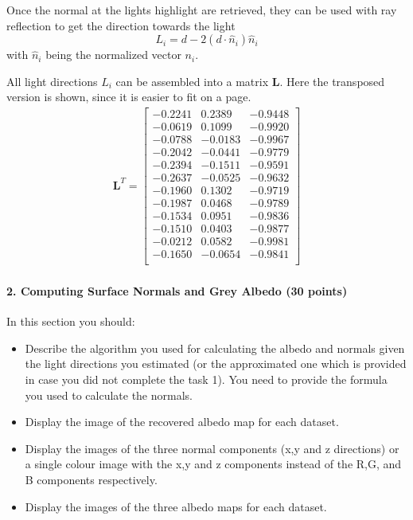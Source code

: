 \documentclass{paper}
\begin{document}
Once the normal at the lights highlight are retrieved, they can be used with ray reflection to get the direction towards the light
\begin{equation}
	L_i = d - 2(d\cdot \hat{n}_i)\hat{n}_i
\end{equation}
with $\hat{n}_i$ being the normalized vector $n_i$.

All light directions $L_i$ can be assembled into a matrix $\mathbf{L}$. Here the
transposed version is shown, since it is easier to fit on a page.
\begin{align*}
\mathbf{L}^T= 
\left[ 
\begin{array}{cccccccccccccc}
-0.2241 & 0.2389 & -0.9448 \\ -0.0619 & 0.1099 & -0.9920 \\ -0.0788 & -0.0183 & -0.9967 \\ -0.2042 & -0.0441 & -0.9779 \\ -0.2394 & -0.1511 & -0.9591 \\ -0.2637 & -0.0525 & -0.9632 \\ -0.1960 & 0.1302 & -0.9719 \\ -0.1987 & 0.0468 & -0.9789 \\ -0.1534 & 0.0951 & -0.9836 \\ -0.1510 & 0.0403 & -0.9877 \\ -0.0212 & 0.0582 & -0.9981 \\ -0.1650 & -0.0654 & -0.9841 \\  
\end{array} 
\right] 
\end{align*}


\paragraph{2. Computing Surface Normals and Grey Albedo (30 points)}

In this section you should:

\begin{itemize}
\item Describe the algorithm you used for calculating the albedo and normals given the light directions you estimated (or the approximated one which is provided in case you did not complete the task 1). You need to provide the formula you used to calculate the normals.

\item Display the image of the recovered albedo map for each dataset.
\item Display the images of the three normal components (x,y and z directions) or a single colour image with the x,y and z components instead of the R,G, and B components respectively.
\item Display the images of the three albedo maps for each dataset. 
\end{itemize}
\end{document}
